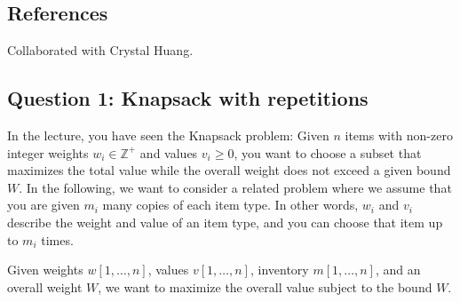 \def\lc{\left\lceil}   
\def\rc{\right\rceil}
\runningheadrule
\firstpageheadrule
\cfoot{}
\subsection*{References}
Collaborated with Crystal Huang.

\subsection*{Question 1: Knapsack with repetitions}

In the lecture, you have seen the Knapsack problem: 
Given $n$ items with non-zero integer weights $w_i \in \mathbb{Z}^+$ and values $v_i \geq 0$, you want to choose a subset that maximizes the total value while the overall weight does not exceed a given bound $W$.
In the following, we want to consider a related problem where we assume that you are given $m_i$ many copies of each item type. In other words, $w_i$ and $v_i$ describe the weight and value of an item type, and you can choose that item up to $m_i$ times.

Given weights $w[1,\ldots,n]$, values $v[1,\ldots,n]$, inventory $m[1,\ldots,n]$, and an overall weight $W$, we want to maximize the overall value subject to the bound $W$. 

